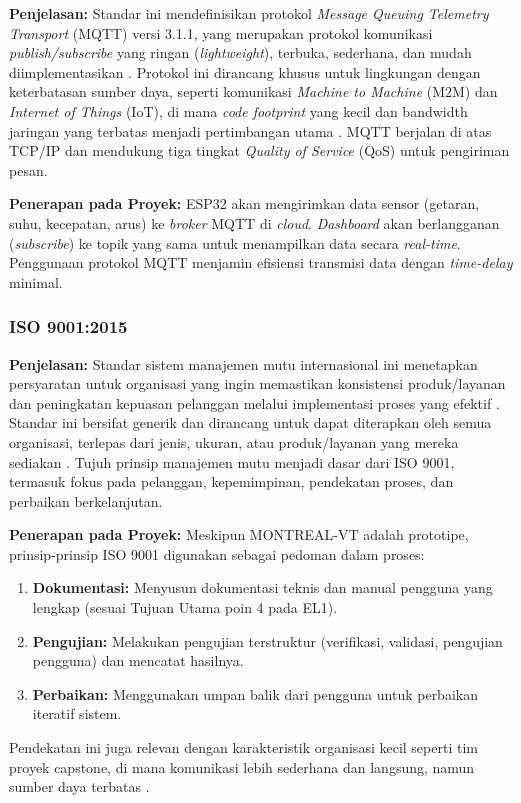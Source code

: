 \documentclass{elsinta}
\begin{document}
\textbf{Penjelasan:} Standar ini mendefinisikan protokol \textit{Message Queuing Telemetry Transport} (MQTT) versi 3.1.1, yang merupakan protokol komunikasi \textit{publish/subscribe} yang ringan (\textit{lightweight}), terbuka, sederhana, dan mudah diimplementasikan \cite{mqtt_2016}. Protokol ini dirancang khusus untuk lingkungan dengan keterbatasan sumber daya, seperti komunikasi \textit{Machine to Machine} (M2M) dan \textit{Internet of Things} (IoT), di mana \textit{code footprint} yang kecil dan bandwidth jaringan yang terbatas menjadi pertimbangan utama \cite{mqtt_2016}. MQTT berjalan di atas TCP/IP dan mendukung tiga tingkat \textit{Quality of Service} (QoS) untuk pengiriman pesan.

\textbf{Penerapan pada Proyek:} ESP32 akan mengirimkan data sensor (getaran, suhu, kecepatan, arus) ke \textit{broker} MQTT di \textit{cloud}. \textit{Dashboard} akan berlangganan (\textit{subscribe}) ke topik yang sama untuk menampilkan data secara \textit{real-time}. Penggunaan protokol MQTT menjamin efisiensi transmisi data dengan \textit{time-delay} minimal.

\subsubsection{ISO 9001:2015}

\textbf{Penjelasan:} Standar sistem manajemen mutu internasional ini menetapkan persyaratan untuk organisasi yang ingin memastikan konsistensi produk/layanan dan peningkatan kepuasan pelanggan melalui implementasi proses yang efektif \cite{iso9001_2015}. Standar ini bersifat generik dan dirancang untuk dapat diterapkan oleh semua organisasi, terlepas dari jenis, ukuran, atau produk/layanan yang mereka sediakan \cite{iso9001_sme}. Tujuh prinsip manajemen mutu menjadi dasar dari ISO 9001, termasuk fokus pada pelanggan, kepemimpinan, pendekatan proses, dan perbaikan berkelanjutan.

\textbf{Penerapan pada Proyek:} Meskipun MONTREAL-VT adalah prototipe, prinsip-prinsip ISO 9001 digunakan sebagai pedoman dalam proses:
\begin{enumerate}
    \item \textbf{Dokumentasi:} Menyusun dokumentasi teknis dan manual pengguna yang lengkap (sesuai Tujuan Utama poin 4 pada EL1).
    \item \textbf{Pengujian:} Melakukan pengujian terstruktur (verifikasi, validasi, pengujian pengguna) dan mencatat hasilnya.
    \item \textbf{Perbaikan:} Menggunakan umpan balik dari pengguna untuk perbaikan iteratif sistem.
\end{enumerate}
Pendekatan ini juga relevan dengan karakteristik organisasi kecil seperti tim proyek capstone, di mana komunikasi lebih sederhana dan langsung, namun sumber daya terbatas \cite{iso9001_sme}.
\end{document}
